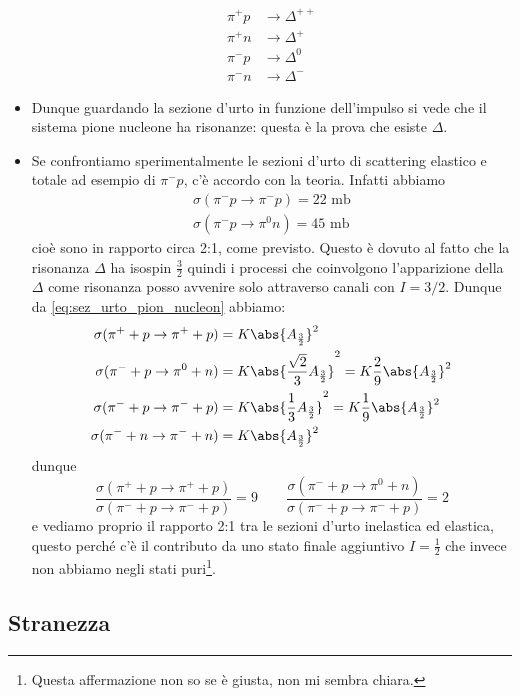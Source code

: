 \begin{itemize}
\begin{align*}
    \pi^+p&\to\Delta^{++}\\
    \pi^+n&\to\Delta^+\\
    \pi^-p&\to\Delta^0\\
    \pi^-n&\to\Delta^-
\end{align*}
\item Dunque guardando la sezione d'urto in funzione dell'impulso si vede che il sistema pione nucleone ha risonanze: questa è la prova che esiste $\Delta$. 
\item Se confrontiamo sperimentalmente le sezioni d'urto di scattering elastico e totale ad esempio di $\pi^-p$, c'è accordo con la teoria. Infatti abbiamo
\begin{gather*}
    \sigma(\pi^-p\to\pi^-p)=22\text{ mb}\\
    \sigma(\pi^-p\to\pi^0n)=45\text{ mb}
\end{gather*}
cioè sono in rapporto circa 2:1, come previsto. Questo è dovuto al fatto che la risonanza $\Delta$ ha isospin $\frac32$ quindi i processi che coinvolgono l'apparizione della $\Delta$ come risonanza posso avvenire solo attraverso canali con $I=3/2$. Dunque da \eqref{eq:sez_urto_pion_nucleon} abbiamo:
    \begin{align*}
        \sigma(\pi^++p\to\pi^++p)&=K\abs{A_{\frac32}}^2\\
        \sigma(\pi^-+p\to\pi^0+n)&=K\abs{\frac{\sqrt2}3 A_{\frac32}}^2=K\frac29\abs{A_{\frac32}}^2\\
        \sigma(\pi^-+p\to\pi^-+p)&=K\abs{\frac13 A_{\frac32}}^2=K\frac19\abs{A_{\frac32}}^2\\
        \sigma(\pi^-+n\to\pi^-+n)&=K\abs{A_{\frac32}}^2
        \end{align*}
        dunque
        \begin{equation*}
            \frac{\sigma(\pi^++p\to\pi^++p)}{\sigma(\pi^-+p\to\pi^-+p)}=9\qquad\frac{\sigma(\pi^-+p\to\pi^0+n)}{\sigma(\pi^-+p\to\pi^-+p)}=2
        \end{equation*}
        e vediamo proprio il rapporto 2:1 tra le sezioni d'urto inelastica ed elastica, questo perché c'è il contributo da uno stato finale aggiuntivo $I=\frac12$ che invece non abbiamo negli stati puri\footnote{Questa affermazione non so se è giusta, non mi sembra chiara.}.
\end{itemize}
\subsection{Stranezza}
